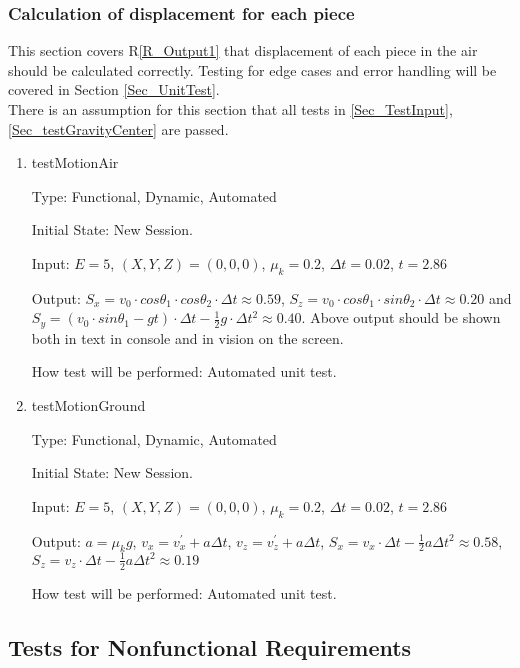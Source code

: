 \documentclass[12pt, titlepage]{article}
\newcommand{\rref}[1]{R\ref{#1}}
\begin{document}
	\subsubsection{Calculation of displacement for each piece}
	\label{Sec_TestMotionAir}
	
	This section covers \rref{R_Output1} that displacement of each piece in the air should be calculated correctly. Testing for edge cases and error handling will be covered in Section \ref{Sec_UnitTest}.\\ 
	There is an assumption for this section that all tests in \ref{Sec_TestInput}, \ref{Sec_testGravityCenter} are passed.
	\begin{enumerate}
		
		\item{testMotionAir\\}
		
		Type: Functional, Dynamic, Automated
		
		Initial State: New Session.
		
		Input: $E = 5$, $(X,Y,Z) = (0,0,0)$, $\mu_{k} = 0.2$, $\Delta t = 0.02$, $t = 2.86$
		
		Output: $S_{x}=v_{0}\cdot cos\theta _{1}\cdot cos\theta _{2}\cdot \Delta t \approx 0.59$, $S_{z}=v_{0}\cdot cos\theta _{1}\cdot sin\theta _{2}\cdot \Delta t \approx 0.20$ and $S_{y}=(v_{0}\cdot sin\theta _{1} - gt)\cdot \Delta t-\frac{1}{2}g \cdot \Delta t^{2} \approx 0.40$. Above output should be shown both in text in console and in vision on the screen. 
		
		How test will be performed: Automated unit test.
		
		\item{testMotionGround\\}
		
		Type: Functional, Dynamic, Automated
		
		Initial State: New Session.
		
		Input: $E = 5$, $(X,Y,Z) = (0,0,0)$, $\mu_{k} = 0.2$, $\Delta t = 0.02$, $t = 2.86$
		
		Output: $a=\mu_{k}g$, $v_{x} = v_{x}^{'} + a\Delta t$, $v_{z} = v_{z}^{'} + a\Delta t$, $S_{x}=v_{x}\cdot \Delta t-\frac{1}{2}a\Delta t^{2} \approx 0.58$, $S_{z}=v_{z}\cdot \Delta t-\frac{1}{2}a\Delta t^{2} \approx 0.19$ 
		
		How test will be performed: Automated unit test.
		
	\end{enumerate}
	
	\subsection{Tests for Nonfunctional Requirements}
	
\end{document}
